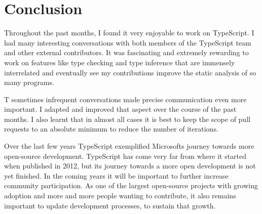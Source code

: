 \documentclass[12pt]{scrartcl}
\begin{document}
\section{Conclusion}

Throughout the past months, I found it very enjoyable to work on TypeScript. I had many interesting conversations with both members of the TypeScript team and other external contributors. It was fascinating and extremely rewarding to work on features like type checking and type inference that are immensely interrelated and eventually see my contributions improve the static analysis of so many programs.

T sometimes infrequent conversations made precise communication even more important. I adapted and improved that aspect over the course of the past months. I also learnt that in almost all cases it is best to keep the scope of pull requests to an absolute minimum to reduce the number of iterations.

Over the last few years TypeScript exemplified Microsofts journey towards more open-source development. TypeScript has come very far from where it started when published in 2012, but its journey towards a more open development is not yet finished. In the coming years it will be important to further increase community participation. As one of the largest open-source projects with growing adoption and more and more people wanting to contribute, it also remains important to update development processes, to sustain that growth.

\clearpage

\printbibliography

\clearpage
\appendix
\end{document}

